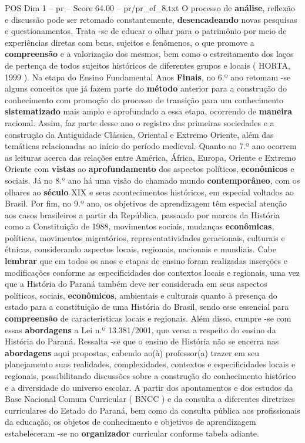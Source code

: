 \begin{textsample}{POS Dim 1 – pr – Score 64.00 – pr/pr\_ef\_8.txt}
O processo de \textbf{análise}, reflexão e discussão pode ser retomado constantemente, \textbf{desencadeando} novas pesquisas e questionamentos.
Trata -se de educar o olhar para o patrimônio por meio de experiências diretas com bens, sujeitos e fenômenos, o que promove a \textbf{compreensão} e a valorização dos mesmos, bem como o estreitamento dos laços de pertença de todos sujeitos históricos de diferentes grupos e locais ( HORTA, 1999 ).
Na etapa do Ensino Fundamental Anos \textbf{Finais}, no 6.º ano retomam -se alguns conceitos que já fazem parte do \textbf{método} anterior para a construção do conhecimento com promoção do processo de transição para um conhecimento \textbf{sistematizado} mais amplo e aprofundado a essa etapa, ocorrendo de \textbf{maneira} racional.
Assim, faz parte desse ano o registro das primeiras sociedades e a construção da Antiguidade Clássica, Oriental e Extremo Oriente, além das temáticas relacionadas ao início do período medieval.
Quanto ao 7.º ano ocorrem as leituras acerca das relações entre América, África, Europa, Oriente e Extremo Oriente com \textbf{vistas} ao \textbf{aprofundamento} dos aspectos políticos, \textbf{econômicos} e sociais.
Já no 8.º ano há uma visão do chamado mundo \textbf{contemporâneo}, com os olhares ao \textbf{século} XIX e seus acontecimentos históricos, em especial voltados ao Brasil.
Por fim, no 9.º ano, os objetivos de aprendizagem têm especial atenção aos casos brasileiros a partir da República, passando por marcos da História como a Constituição de 1988, movimentos sociais, mudanças \textbf{econômicas}, políticas, movimentos migratórios, representatividades geracionais, culturais e étnicas, considerando aspectos locais, regionais, nacionais e mundiais.
Cabe \textbf{lembrar} que em todos os anos e etapas de ensino foram realizadas inserções e modificações conforme as especificidades dos contextos locais e regionais, uma vez que a História do Paraná também deve ser considerada em seus aspectos políticos, sociais, \textbf{econômicos}, ambientais e culturais quanto à presença do estado para a constituição de uma História do Brasil, sendo esse essencial para \textbf{compreensão} de características locais e regionais.
Além disso, cumpre -se com essas \textbf{abordagens} a Lei n.º 13.381/2001, que versa a respeito do ensino da História do Paraná.
Ressalta -se que o ensino de História não se encerra nas \textbf{abordagens} aqui propostas, cabendo ao(à) professor(a) trazer em seu planejamento suas realidades, complexidades, contextos e especificidades locais e regionais, possibilitando discussões sobre a construção do conhecimento histórico e a diversidade do universo escolar.
A partir dos apontamentos e dos estudos da Base Nacional Comum Curricular ( BNCC ) e da consulta a diferentes diretrizes curriculares do Estado do Paraná, bem como da consulta pública aos profissionais da educação, os objetos de conhecimento e objetivos de aprendizagem estabeleceram -se no \textbf{organizador} curricular conforme tabela adiante.


\end{textsample}
